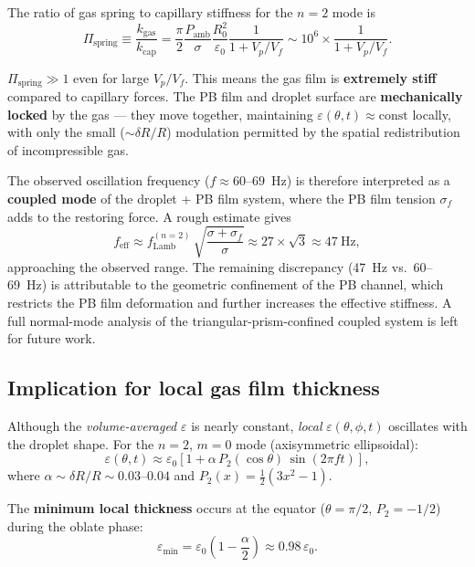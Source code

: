 \documentclass[%
 preprint,
 superscriptaddress,
 amsmath,amssymb,
 aps, prl,
]{revtex4-2}
\begin{document}
The ratio of gas spring to capillary stiffness for the $n=2$ mode is
\begin{equation}
\Pi_{\text{spring}} \equiv \frac{k_{\text{gas}}}{k_{\text{cap}}}
= \frac{\pi}{2}\frac{P_{\text{amb}}}{\sigma}
\frac{R_0^2}{\varepsilon_0}\frac{1}{1 + V_p/V_f}
\sim 10^6 \times \frac{1}{1 + V_p/V_f}.
\end{equation}

$\Pi_{\text{spring}} \gg 1$ even for large $V_p/V_f$.
This means the gas film is \textbf{extremely stiff} compared to capillary
forces.  The PB film and droplet surface are \textbf{mechanically locked}
by the gas --- they move together, maintaining $\varepsilon(\theta,t)
\approx \text{const}$ locally, with only the small ($\sim \delta R/R$)
modulation permitted by the spatial redistribution of incompressible gas.

The observed oscillation frequency ($f \approx 60$--$69$~Hz) is therefore
interpreted as a \textbf{coupled mode} of the droplet + PB film system,
where the PB film tension $\sigma_f$ adds to the restoring force.
A rough estimate gives
\begin{equation}
f_{\text{eff}} \approx f_{\text{Lamb}}^{(n=2)}\,
\sqrt{\frac{\sigma + \sigma_f}{\sigma}}
\approx 27 \times \sqrt{3} \approx 47~\text{Hz},
\end{equation}
approaching the observed range.  The remaining discrepancy (47~Hz vs.\
60--69~Hz) is attributable to the geometric confinement of the PB channel,
which restricts the PB film deformation and further increases the
effective stiffness.  A full normal-mode analysis of the
triangular-prism-confined coupled system is left for future work.

\subsection{Implication for local gas film thickness}

Although the \emph{volume-averaged} $\varepsilon$ is nearly constant,
\emph{local} $\varepsilon(\theta,\phi,t)$ oscillates with the
droplet shape.  For the $n=2$, $m=0$ mode (axisymmetric ellipsoidal):
\begin{equation}
\varepsilon(\theta,t) \approx \varepsilon_0\left[
1 + \alpha\,P_2(\cos\theta)\,\sin(2\pi f t)
\right],
\end{equation}
where $\alpha \sim \delta R/R \sim 0.03$--$0.04$ and
$P_2(x) = \frac{1}{2}(3x^2-1)$.

The \textbf{minimum local thickness} occurs at the equator
($\theta = \pi/2$, $P_2 = -1/2$) during the oblate phase:
\begin{equation}
\varepsilon_{\min} = \varepsilon_0\left(1 - \frac{\alpha}{2}\right)
\approx 0.98\,\varepsilon_0.
\end{equation}
\end{document}
